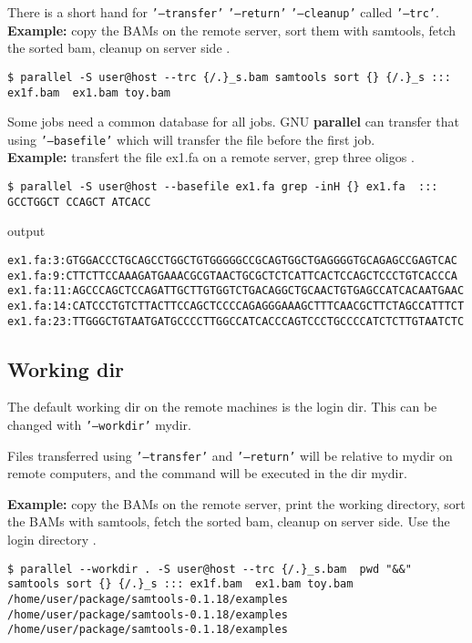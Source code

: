 \documentclass{article}
\newcommand{\example}[1]{
\textbf{Example: } {\color[rgb]{0,0,1} #1 } .
}
\newcommand{\cmdoption}[1]{\texttt{'#1'}}
\def\prl{\textbf{parallel}}
\begin{document}
There is a short hand for \cmdoption{--transfer} \cmdoption{--return} \cmdoption{--cleanup} called \cmdoption{--trc}.\\
\example{copy the BAMs on the remote server, sort them with samtools, fetch the sorted bam, cleanup on server side}
\begin{lstlisting}
$ parallel -S user@host --trc {/.}_s.bam samtools sort {} {/.}_s ::: ex1f.bam  ex1.bam toy.bam
\end{lstlisting}


Some jobs need a common database for all jobs. GNU \prl{} can transfer that using \cmdoption{--basefile} which will transfer the file before the first job.\\
\example{transfert the file  ex1.fa on a remote server, grep three oligos}
\begin{lstlisting}
$ parallel -S user@host --basefile ex1.fa grep -inH {} ex1.fa  :::  GCCTGGCT CCAGCT ATCACC
\end{lstlisting}
output
\begin{lstlisting}
ex1.fa:3:GTGGACCCTGCAGCCTGGCTGTGGGGGCCGCAGTGGCTGAGGGGTGCAGAGCCGAGTCAC
ex1.fa:9:CTTCTTCCAAAGATGAAACGCGTAACTGCGCTCTCATTCACTCCAGCTCCCTGTCACCCA
ex1.fa:11:AGCCCAGCTCCAGATTGCTTGTGGTCTGACAGGCTGCAACTGTGAGCCATCACAATGAAC
ex1.fa:14:CATCCCTGTCTTACTTCCAGCTCCCCAGAGGGAAAGCTTTCAACGCTTCTAGCCATTTCT
ex1.fa:23:TTGGGCTGTAATGATGCCCCTTGGCCATCACCCAGTCCCTGCCCCATCTCTTGTAATCTC
\end{lstlisting}
  


\subsection{Working dir}
The default working dir on the remote machines is the login dir. This can be changed with \cmdoption{--workdir} mydir.

Files transferred using \cmdoption{--transfer} and \cmdoption{--return} will be relative to mydir on remote computers, and the command will be executed in the dir mydir.



\example{copy the BAMs on the remote server, print the working directory, sort the BAMs with samtools, fetch the sorted bam, cleanup on server side. Use the login directory}
\begin{lstlisting}
$ parallel --workdir . -S user@host --trc {/.}_s.bam  pwd "&&" samtools sort {} {/.}_s ::: ex1f.bam  ex1.bam toy.bam
/home/user/package/samtools-0.1.18/examples
/home/user/package/samtools-0.1.18/examples
/home/user/package/samtools-0.1.18/examples
\end{lstlisting}
\end{document}
